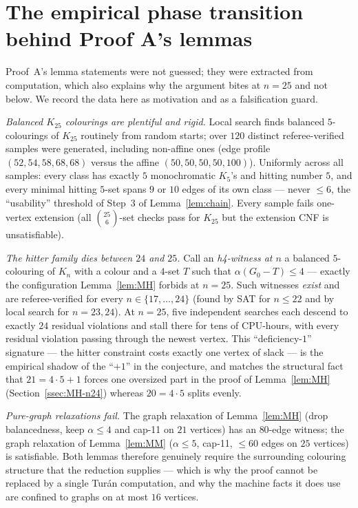 \documentclass[11pt,reqno]{amsart}
\theoremstyle{definition}
\theoremstyle{remark}
\newcommand{\capeleven}{\textsf{cap-11}}
\begin{document}
\section{The empirical phase transition behind Proof A's lemmas}\label{app:phase}

Proof~A's lemma statements were not guessed; they were extracted from computation, which
also explains why the argument bites at $n=25$ and not below. We record the data
here as motivation and as a falsification guard.

\emph{Balanced $K_{25}$ colourings are plentiful and rigid.} Local search finds
balanced $5$-colourings of $K_{25}$ routinely from random starts; over $120$
distinct referee-verified samples were generated, including non-affine ones (edge
profile $(52,54,58,68,68)$ versus the affine $(50,50,50,50,100)$). Uniformly across
all samples: every class has exactly $5$ monochromatic $K_5$'s and hitting number
$5$, and every minimal hitting $5$-set spans $9$ or $10$ edges of its own class ---
never $\le 6$, the ``usability'' threshold of Step~3 of Lemma~\ref{lem:chain}. Every
sample fails one-vertex extension (all $\binom{25}{6}$-set checks pass for $K_{25}$
but the extension CNF is unsatisfiable).

\emph{The hitter family dies between $24$ and $25$.} Call an \emph{h4-witness at $n$}
a balanced $5$-colouring of $K_n$ with a colour and a $4$-set $T$ such that
$\alpha(G_0-T)\le 4$ --- exactly the configuration Lemma~\ref{lem:MH} forbids at
$n=25$. Such witnesses \emph{exist} and are referee-verified for every
$n\in\{17,\dots,24\}$ (found by SAT for $n\le 22$ and by local search for $n=23,24$).
At $n=25$, five independent searches each descend to exactly $24$ residual violations
and stall there for tens of CPU-hours, with every residual violation passing through
the newest vertex. This ``deficiency-$1$'' signature --- the hitter constraint costs
exactly one vertex of slack --- is the empirical shadow of the ``$+1$'' in the
conjecture, and matches the structural fact that $21=4\cdot 5+1$ forces one oversized
part in the proof of Lemma~\ref{lem:MH} (Section~\ref{ssec:MH-n24}) whereas
$20=4\cdot 5$ splits evenly.

\emph{Pure-graph relaxations fail.} The graph relaxation of Lemma~\ref{lem:MH}
(drop balancedness, keep $\alpha\le 4$ and \capeleven{} on $21$ vertices) has an
$80$-edge witness; the graph relaxation of Lemma~\ref{lem:MM}
($\alpha\le 5$, \capeleven, $\le 60$ edges on $25$ vertices) is satisfiable. Both
lemmas therefore genuinely require the surrounding colouring structure that the
reduction supplies --- which is why the proof cannot be replaced by a single Tur\'an
computation, and why the machine facts it does use are confined to graphs on at most
$16$ vertices.
\end{document}
